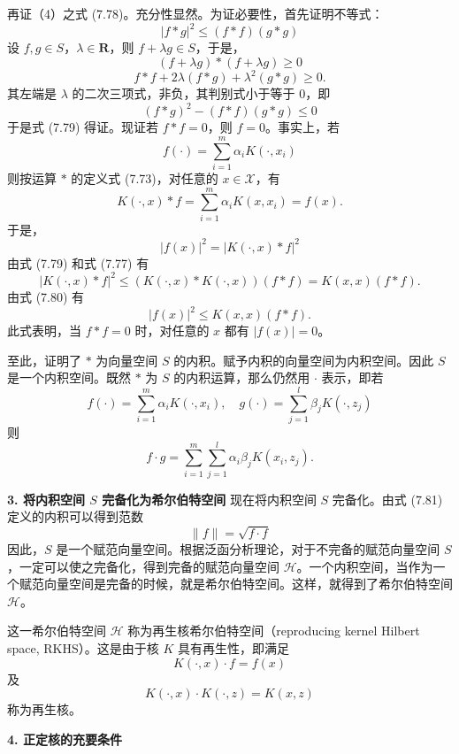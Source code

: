 \documentclass[UTF8,12pt,a4paper,fontset=fandol]{ctexart}
\begin{document}
再证（4）之式 (7.78)。充分性显然。为证必要性，首先证明不等式：
\begin{equation}
|f*g|^2\leq (f*f)(g*g)
\tag{7.79}
\end{equation}
设 $f,g\in S$，$\lambda\in\mathbf{R}$，则 $f+\lambda g\in S$，于是，
\[
(f+\lambda g)*(f+\lambda g)\geq 0
\]
\[
f*f+2\lambda(f*g)+\lambda^2(g*g)\geq 0.
\]
其左端是 $\lambda$ 的二次三项式，非负，其判别式小于等于 0，即
\[
(f*g)^2-(f*f)(g*g)\leq 0
\]
于是式 (7.79) 得证。现证若 $f*f=0$，则 $f=0$。事实上，若
\[
f(\cdot)=\sum_{i=1}^m\alpha_iK(\cdot,x_i)
\]
则按运算 $*$ 的定义式 (7.73)，对任意的 $x\in\mathcal{X}$，有
\[
K(\cdot,x)*f=\sum_{i=1}^m\alpha_iK(x,x_i)=f(x).
\]
于是，
\begin{equation}
|f(x)|^2=|K(\cdot,x)*f|^2
\tag{7.80}
\end{equation}
由式 (7.79) 和式 (7.77) 有
\[
|K(\cdot,x)*f|^2\leq (K(\cdot,x)*K(\cdot,x))(f*f)=K(x,x)(f*f).
\]
由式 (7.80) 有
\[
|f(x)|^2\leq K(x,x)(f*f).
\]
此式表明，当 $f*f=0$ 时，对任意的 $x$ 都有 $|f(x)|=0$。

至此，证明了 $*$ 为向量空间 $S$ 的内积。赋予内积的向量空间为内积空间。因此 $S$ 是一个内积空间。既然 $*$ 为 $S$ 的内积运算，那么仍然用 $\cdot$ 表示，即若
\[
f(\cdot)=\sum_{i=1}^m\alpha_iK(\cdot,x_i),\quad g(\cdot)=\sum_{j=1}^l\beta_jK(\cdot,z_j)
\]
则
\begin{equation}
f\cdot g=\sum_{i=1}^m\sum_{j=1}^l\alpha_i\beta_jK(x_i,z_j).
\tag{7.81}
\end{equation}

\noindent\textbf{3. 将内积空间 $S$ 完备化为希尔伯特空间}\quad
现在将内积空间 $S$ 完备化。由式 (7.81) 定义的内积可以得到范数
\begin{equation}
\|f\|=\sqrt{f\cdot f}
\tag{7.82}
\end{equation}
因此，$S$ 是一个赋范向量空间。根据泛函分析理论，对于不完备的赋范向量空间 $S$，一定可以使之完备化，得到完备的赋范向量空间 $\mathcal{H}$。一个内积空间，当作为一个赋范向量空间是完备的时候，就是希尔伯特空间。这样，就得到了希尔伯特空间 $\mathcal{H}$。

这一希尔伯特空间 $\mathcal{H}$ 称为再生核希尔伯特空间（reproducing kernel Hilbert space, RKHS）。这是由于核 $K$ 具有再生性，即满足
\begin{equation}
K(\cdot,x)\cdot f=f(x)
\tag{7.83}
\end{equation}
及
\begin{equation}
K(\cdot,x)\cdot K(\cdot,z)=K(x,z)
\tag{7.84}
\end{equation}
称为再生核。

\noindent\textbf{4. 正定核的充要条件}\quad
\end{document}
